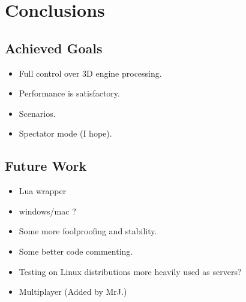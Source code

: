 
\chapter{Conclusions}

\section{Achieved Goals}
\begin{itemize}
\item Full control over 3D engine processing.
\item Performance is satisfactory.
\item Scenarios.
\item Spectator mode (I hope). 
\end{itemize}

\section{Future Work}
\begin{itemize}
\item Lua wrapper
\item windows/mac ?
\item Some more foolproofing and stability.
\item Some better code commenting.
\item Testing on Linux distributions more heavily used as servers? 
\item Multiplayer (Added by MrJ.)
\end{itemize}